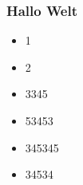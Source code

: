 \documentclass[12pt,ngerman]{beamer}
\begin{document}
\begin{frame}
\frametitle{Hallo Welt}

\begin{itemize}
\item 1
\item 2
\item 3345
\item 53453
\item 345345
\item 34534
\end{itemize}
\end{frame}
\end{document}
